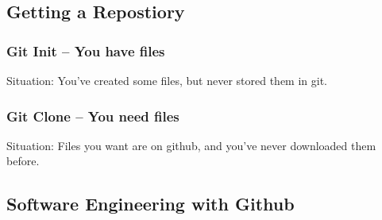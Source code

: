 \documentclass[handout]{beamer}
\begin{document}
\subsection[Getting a Repository]{Getting a Repostiory}

\begin{frame}
\frametitle{Git Init -- You have files}
\alert{Situation:} You've created some files, but never stored them in git.

\vspace{.05\textwidth}


\vspace{.05\textwidth}
\begin{enumerate}
\end{enumerate}
\end{frame}

\begin{frame}
\frametitle{Git Clone -- You need files}
\alert{Situation:} Files you want are on github, and you've never downloaded
them before.

\vspace{.05\textwidth}


\vspace{.05\textwidth}
\begin{enumerate}
\end{enumerate}
\end{frame}

\subsection[Github]{Software Engineering with Github}
\end{document}
